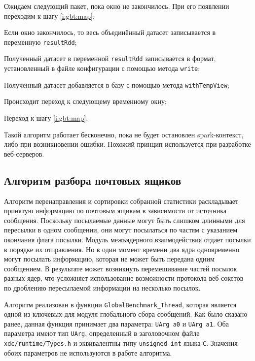 \begin{enumerate_step}
    \item Ожидаем следующий пакет, пока окно не закончилось. 
    При его появлении переходим к шагу \ref{i:gbt:map};
    \item Если окно закончилось, то весь объединённый датасет записывается в переменную \texttt{resultRdd};
    \item Полученный датасет в переменной \texttt{resultRdd} записывается в формат, установленный в файле конфигурации с помощью метода \texttt{write};
    \item Полученный датасет добавляется в базу с помощью метода \texttt{withTempView};
    \item Происходит переход к следующему временному окну;
    \item Переход к шагу \ref{i:gbt:map}.
\end{enumerate_step}

Такой алгоритм работает бесконечно, пока не будет остановлен spark-контекст, либо при возникновении ошибки.
Похожий принцип используется при разработке веб-серверов.


\subsection{Алгоритм разбора почтовых ящиков}
Алгоритм перенаправления и сортировки собранной статистики раскладывает
принятую информацию по почтовым ящикам в зависимости от источника сообщения.
Поскольку посылаемые данные могут быть слишком длинными для пересылки в
одном сообщении, они могут посылаться по частям с указанием окончания флага посылки.
Модуль межъядерного взаимодействия отдает посылки в порядке их отправления.
Но в один момент времени два ядра одновременно могут посылать информацию,
которая не может быть передана одним сообщением. В результате может возникнуть
перемешивание частей посылок разных ядер, что усложняет использование
возможности протокола веб-сокетов по дроблению пересылаемой информации на
несколько посылок.

Алгоритм реализован в функции \texttt{GlobalBenchmark\_Thread}, которая
является одной из ключевых для модуля глобального сбора сообщений. Как было сказано
ранее, данная функция принимает два параметра: \texttt{UArg a0} и \texttt{UArg a1}.
Оба параметра имеют тип \texttt{UArg}, определенный в заголовочном файле
\texttt{xdc/runtime/Types.h} и эквивалентны типу \texttt{unsigned int} языка
\texttt{C}. Значения обоих параметров не используются в работе алгоритма.

